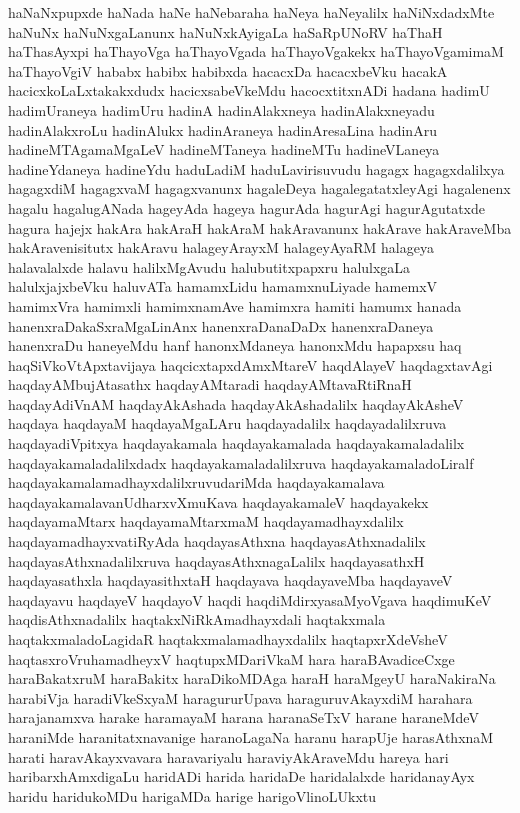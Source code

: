 {haNaNxpupxde
haNada
haNe
haNebaraha
haNeya
haNeyalilx
haNiNxdadxMte
haNuNx
haNuNxgaLanunx
haNuNxkAyigaLa
haSaRpUNoRV
haThaH
haThasAyxpi
haThayoVga
haThayoVgada
haThayoVgakekx
haThayoVgamimaM
haThayoVgiV
hababx
habibx
habibxda
hacacxDa
hacacxbeVku
hacakA
hacicxkoLaLxtakakxdudx
hacicxsabeVkeMdu
hacocxtitxnADi
hadana
hadimU
hadimUraneya
hadimUru
hadinA
hadinAlakxneya
hadinAlakxneyadu
hadinAlakxroLu
hadinAlukx
hadinAraneya
hadinAresaLina
hadinAru
hadineMTAgamaMgaLeV
hadineMTaneya
hadineMTu
hadineVLaneya
hadineYdaneya
hadineYdu
haduLadiM
haduLavirisuvudu
hagagx
hagagxdalilxya
hagagxdiM
hagagxvaM
hagagxvanunx
hagaleDeya
hagalegatatxleyAgi
hagalenenx
hagalu
hagalugANada
hageyAda
hageya
hagurAda
hagurAgi
hagurAgutatxde
hagura
hajejx
hakAra
hakAraH
hakAraM
hakAravanunx
hakArave
hakAraveMba
hakAravenisitutx
hakAravu
halageyArayxM
halageyAyaRM
halageya
halavalalxde
halavu
halilxMgAvudu
halubutitxpapxru
halulxgaLa
halulxjajxbeVku
haluvATa
hamamxLidu
hamamxnuLiyade
hamemxV
hamimxVra
hamimxli
hamimxnamAve
hamimxra
hamiti
hamumx
hanada
hanenxraDakaSxraMgaLinAnx
hanenxraDanaDaDx
hanenxraDaneya
hanenxraDu
haneyeMdu
hanf
hanonxMdaneya
hanonxMdu
hapapxsu
haq
haqSiVkoVtApxtavijaya
haqcicxtapxdAmxMtareV
haqdAlayeV
haqdagxtavAgi
haqdayAMbujAtasathx
haqdayAMtaradi
haqdayAMtavaRtiRnaH
haqdayAdiVnAM
haqdayAkAshada
haqdayAkAshadalilx
haqdayAkAsheV
haqdaya
haqdayaM
haqdayaMgaLAru
haqdayadalilx
haqdayadalilxruva
haqdayadiVpitxya
haqdayakamala
haqdayakamalada
haqdayakamaladalilx
haqdayakamaladalilxdadx
haqdayakamaladalilxruva
haqdayakamaladoLiralf
haqdayakamalamadhayxdalilxruvudariMda
haqdayakamalava
haqdayakamalavanUdharxvXmuKava
haqdayakamaleV
haqdayakekx
haqdayamaMtarx
haqdayamaMtarxmaM
haqdayamadhayxdalilx
haqdayamadhayxvatiRyAda
haqdayasAthxna
haqdayasAthxnadalilx
haqdayasAthxnadalilxruva
haqdayasAthxnagaLalilx
haqdayasathxH
haqdayasathxla
haqdayasithxtaH
haqdayava
haqdayaveMba
haqdayaveV
haqdayavu
haqdayeV
haqdayoV
haqdi
haqdiMdirxyasaMyoVgava
haqdimuKeV
haqdisAthxnadalilx
haqtakxNiRkAmadhayxdali
haqtakxmala
haqtakxmaladoLagidaR
haqtakxmalamadhayxdalilx
haqtapxrXdeVsheV
haqtasxroVruhamadheyxV
haqtupxMDariVkaM
hara
haraBAvadiceCxge
haraBakatxruM
haraBakitx
haraDikoMDAga
haraH
haraMgeyU
haraNakiraNa
harabiVja
haradiVkeSxyaM
haragururUpava
haraguruvAkayxdiM
harahara
harajanamxva
harake
haramayaM
harana
haranaSeTxV
harane
haraneMdeV
haraniMde
haranitatxnavanige
haranoLagaNa
haranu
harapUje
harasAthxnaM
harati
haravAkayxvavara
haravariyalu
haraviyAkAraveMdu
hareya
hari
haribarxhAmxdigaLu
haridADi
harida
haridaDe
haridalalxde
haridanayAyx
haridu
haridukoMDu
harigaMDa
harige
harigoVlinoLUkxtu
}

